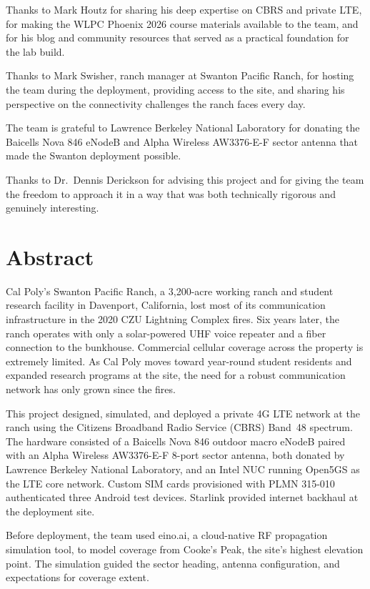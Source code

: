 \documentclass[
    left=1.5in,
    right=1.25in,
    top=1.25in,
    bottom=1.25in
]{CalPolySeniorProject}
\begin{document}
Thanks to Mark Houtz for sharing his deep expertise on CBRS and private LTE,
for making the WLPC Phoenix 2026 course materials available to the team, and
for his blog and community resources that served as a practical foundation for
the lab build.

Thanks to Mark Swisher, ranch manager at Swanton Pacific Ranch, for hosting
the team during the deployment, providing access to the site, and sharing his
perspective on the connectivity challenges the ranch faces every day.

The team is grateful to Lawrence Berkeley National Laboratory for donating the
Baicells Nova 846 eNodeB and Alpha Wireless AW3376-E-F sector antenna that made
the Swanton deployment possible.

Thanks to Dr.\ Dennis Derickson for advising this project and for giving the
team the freedom to approach it in a way that was both technically rigorous and
genuinely interesting.

\clearpage
\section*{Abstract}

Cal Poly's Swanton Pacific Ranch, a 3,200-acre working ranch and student
research facility in Davenport, California, lost most of its communication
infrastructure in the 2020 CZU Lightning Complex fires. Six years later, the
ranch operates with only a solar-powered UHF voice repeater and a fiber
connection to the bunkhouse. Commercial cellular coverage across the property
is extremely limited. As Cal Poly moves toward year-round student residents and
expanded research programs at the site, the need for a robust communication
network has only grown since the fires.

This project designed, simulated, and deployed a private 4G LTE network at the
ranch using the Citizens Broadband Radio Service (CBRS) Band~48 spectrum. The
hardware consisted of a Baicells Nova 846 outdoor macro eNodeB paired with an
Alpha Wireless AW3376-E-F 8-port sector antenna, both donated by Lawrence
Berkeley National Laboratory, and an Intel NUC running Open5GS as the LTE core
network. Custom SIM cards provisioned with PLMN 315-010 authenticated three
Android test devices. Starlink provided internet backhaul at the deployment
site.

Before deployment, the team used eino.ai, a cloud-native RF propagation
simulation tool, to model coverage from Cooke's Peak, the site's highest
elevation point. The simulation guided the sector heading, antenna
configuration, and expectations for coverage extent.
\end{document}
